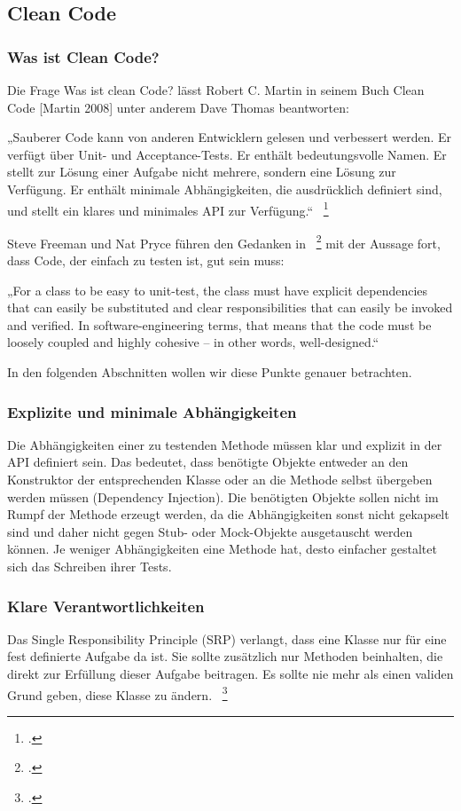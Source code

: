 \subsection{Clean Code}
\subsubsection{Was ist Clean Code?}
Die Frage Was ist clean Code? lässt Robert C. Martin in seinem Buch Clean Code
[Martin 2008] unter anderem Dave Thomas beantworten:

„Sauberer Code kann von anderen Entwicklern gelesen und verbessert werden. Er verfügt
über Unit- und Acceptance-Tests. Er enthält bedeutungsvolle Namen. Er stellt zur
Lösung einer Aufgabe nicht mehrere, sondern eine Lösung zur Verfügung. Er enthält
minimale Abhängigkeiten, die ausdrücklich definiert sind, und stellt ein klares und
minimales API zur Verfügung.“ ~\footcite[Vgl.]{Martin.2008}

Steve Freeman und Nat Pryce führen den Gedanken in ~\footcite[Vgl.]{Freeman.2009} mit der Aussage
fort, dass Code, der einfach zu testen ist, gut sein muss:

„For a class to be easy to unit-test, the class must have explicit dependencies that can
easily be substituted and clear responsibilities that can easily be invoked and verified.
In software-engineering terms, that means that the code must be loosely coupled and
highly cohesive – in other words, well-designed.“

In den folgenden Abschnitten wollen wir diese Punkte genauer betrachten.

\subsubsection{Explizite und minimale Abhängigkeiten} %
Die Abhängigkeiten einer zu testenden Methode müssen klar und explizit in der API definiert sein. Das bedeutet, dass benötigte Objekte entweder an den Konstruktor der entsprechenden Klasse oder an die Methode selbst übergeben werden müssen (Dependency Injection). Die benötigten Objekte sollen nicht im Rumpf der Methode erzeugt werden, da die Abhängigkeiten sonst nicht gekapselt sind und daher nicht gegen Stub- oder Mock-Objekte ausgetauscht werden können. Je weniger Abhängigkeiten eine Methode hat, desto einfacher gestaltet sich das Schreiben ihrer Tests.

\subsubsection{Klare Verantwortlichkeiten}
Das Single Responsibility Principle (SRP) verlangt, dass eine Klasse nur für eine
fest definierte Aufgabe da ist. Sie sollte zusätzlich nur Methoden beinhalten, die direkt
zur Erfüllung dieser Aufgabe beitragen. Es sollte nie mehr als einen validen Grund geben, diese Klasse zu ändern. ~\footcite[Vgl.]{Martin.2002}

